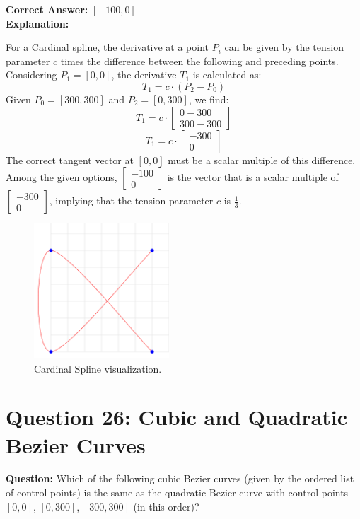 \documentclass[notitlepage]{llncs}
\begin{document}
\textbf{Correct Answer:} \([-100,0]\)
\\

\textbf{Explanation:}

For a Cardinal spline, the derivative at a point \( P_i \) can be given by the tension parameter \( c \) times the difference between the following and preceding points. Considering \( P_1 = [0, 0] \), the derivative \( T_1 \) is calculated as:
\[ T_1 = c \cdot (P_{2} - P_{0}) \]
Given \( P_0 = [300, 300] \) and \( P_2 = [0, 300] \), we find:
\[ T_1 = c \cdot \begin{bmatrix}
                            0 - 300 \\
                            300 - 300
                        \end{bmatrix} \]
\[ T_1 = c \cdot \begin{bmatrix}
                            -300 \\
                            0
                        \end{bmatrix} \]
The correct tangent vector at \([0, 0]\) must be a scalar multiple of this difference. Among the given options, \(\begin{bmatrix}
-100 \\
0
\end{bmatrix}\) is the vector that is a scalar multiple of \(\begin{bmatrix}
-300 \\
0
\end{bmatrix}\), implying that the tension parameter \( c \) is \( \frac{1}{3} \).

\begin{figure}[h]
    \centering
    \includegraphics[width=0.45\textwidth]{CardinalSpline.png}
    \caption{Cardinal Spline visualization.}
\end{figure}


\newpage
\section*{Question 26: Cubic and Quadratic Bezier Curves}
\textbf{Question:} Which of the following cubic Bezier curves (given by the ordered list of control points) is the same as the quadratic Bezier curve with control points \([0, 0]\), \([0, 300]\), \([300, 300]\) (in this order)?
\\
\end{document}
